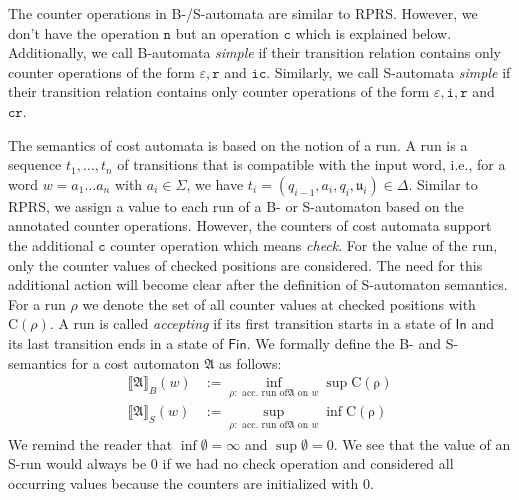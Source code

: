 \documentclass{LMCS}
\newcommand{\eps}{\varepsilon}
\newcommand{\automatonA}{\mathfrak A}
\newcommand{\In}{\mathsf{In}}
\newcommand{\Fin}{\mathsf{Fin}}
\newcommand{\semantics}[1]{\llbracket#1\rrbracket}
\newcommand{\iOp}{\ensuremath{\mathtt{i}}}
\newcommand{\rOp}{\ensuremath{\mathtt{r}}}
\newcommand{\nOp}{\ensuremath{\mathtt{n}}}
\newcommand{\cOp}{\ensuremath{\mathtt{c}}}
\newcommand{\icOp}{\ensuremath{\mathtt{i\! c}}}
\newcommand{\crOp}{\ensuremath{\mathtt{c\! r}}}
\newcommand{\fraku}{\mathfrak u}
\newcommand{\RPRS}{\textsf{RPRS}}
\begin{document}
The counter operations in B-/S-automata are similar to \RPRS{}. However,
we don't have the operation $\nOp$ but an operation $\cOp$ which is explained 
below. Additionally, we call B-automata \emph{simple} if
their transition relation contains only counter operations of the form 
$\eps,\rOp$ and $\icOp$. Similarly, we call S-automata \emph{simple} if their transition
relation contains only counter operations of the form $\eps,\iOp,\rOp$ and $\crOp$.

The semantics of cost automata is based on the notion of a run. A run is 
a sequence $t_1,\ldots,t_{n}$ of transitions that is
compatible with the input word, i.e., for a word $w = a_1\ldots a_n$
with $a_i \in \Sigma$, we have $t_i = (q_{i-1},a_{i},q_{i},\fraku_{i}) \in \Delta$.
Similar to \RPRS{}, we
assign a value to each run of a B- or S-automaton based on the annotated counter
operations. However, the counters of cost automata support the additional $\cOp$
counter operation which means \emph{check}. For the value of the run, only the
counter values of checked positions are considered. The need for this additional
action will become clear after the definition of S-automaton semantics. 
For a run $\rho$ we denote the set of all counter values at checked positions 
with $\mathrm{C}(\rho)$. A run is called \emph{accepting} if its first transition
starts in a state of $\In$ and its last transition ends in a state of $\Fin$.
We formally define the B- and S-semantics for a cost automaton $\automatonA$
as follows:
\begin{align*}
	\semantics{\automatonA}_B(w) &:= \inf_{\rho : \text{ acc. run of
$\automatonA$ on $w$}} \sup \mathrm{C(\rho)} \\
	\semantics{\automatonA}_S(w) &:= \sup_{\rho : \text{ acc. run of
$\automatonA$ on $w$}} \inf \mathrm{C(\rho)} 
\end{align*}
We remind the reader that $\inf \emptyset = \infty$ and $\sup \emptyset
= 0$. We see that the value of an S-run would always be $0$ if we had no check 
operation and considered all occurring values because the counters are 
initialized with $0$. 
\end{document}
